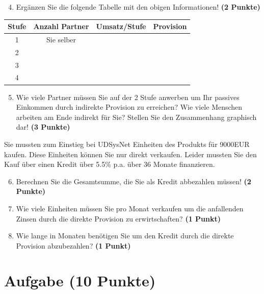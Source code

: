\documentclass[a4paper, 9pt]{scrartcl}\usepackage[]{graphicx}\usepackage[]{xcolor}
\begin{document}
\begin{enumerate}
  \setcounter{enumi}{3}
\item Erg{\"a}nzen Sie die folgende Tabelle mit den obigen Informationen! \textbf{(2 Punkte)}
\end{enumerate}

\begin{center}
\begin{tabular}{c|c|c|c}
  \toprule
  \textbf{Stufe} & \textbf{Anzahl Partner}  & \textbf{Umsatz/Stufe} & \textbf{Provision}\\
  \midrule
  1 & Sie selber  &  & \\ \midrule
  2 &   &  &  \\ \midrule
  3 &   &  &  \\ \midrule
  4 &   &  &  \\
  \bottomrule
\end{tabular}
\end{center}

\begin{enumerate}
  \setcounter{enumi}{4}
\item Wie viele Partner m{\"u}ssen Sie auf der 2 Stufe anwerben um Ihr passives
  Einkommen durch indirekte Provision zu erreichen? Wie viele Menschen
  arbeiten am Ende indirekt f{\"u}r Sie? Stellen Sie den
  Zusammenhang graphisch dar!  \textbf{(3 Punkte)}
\end{enumerate}

Sie mussten zum Einstieg bei UDSysNet Einheiten des Produkts
f{\"u}r 9000EUR kaufen. Diese Einheiten k{\"o}nnen Sie nur direkt
verkaufen. Leider mussten Sie den Kauf {\"u}ber einen Kredit {\"u}ber
5.5\% p.a. {\"u}ber 36 Monate finanzieren.

\begin{enumerate}
  \setcounter{enumi}{5}
\item Berechnen Sie die Gesamtsumme, die Sie als Kredit abbezahlen m{\"u}ssen! \textbf{(2 Punkte)}
\item Wie viele Einheiten m{\"u}ssen Sie pro Monat verkaufen um die anfallenden Zinsen
  durch die direkte Provision zu erwirtschaften? \textbf{(1 Punkt)}
\item Wie lange in
  Monaten ben{\"o}tigen Sie um den Kredit durch die direkte
  Provision abzubezahlen? \textbf{(1 Punkt)}
\end{enumerate} 
\clearpage

\section{Aufgabe \hfill (10 Punkte)}
\end{document}
